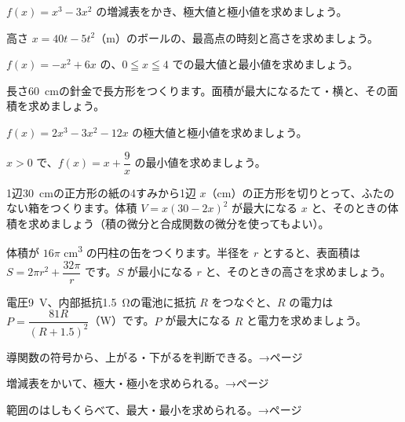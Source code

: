 \bkendproblems
{}

\bkproblem $f(x)=x^3-3x^2$ の増減表をかき、極大値と極小値を求めましょう。

\bkproblem 高さ $x=40t-5t^2$（m）のボールの、最高点の時刻と高さを求めましょう。

\bkproblem $f(x)=-x^2+6x$ の、$0\leqq x\leqq4$ での最大値と最小値を求めましょう。

\bkproblem 長さ\qty{60}{cm}の針金で長方形をつくります。面積が最大になるたて・横と、その面積を求めましょう。

\bkproblem $f(x)=2x^3-3x^2-12x$ の極大値と極小値を求めましょう。

\bkproblem $x>0$ で、$f(x)=x+\dfrac{9}{x}$ の最小値を求めましょう。


\bkproblem 1辺\qty{30}{cm}の正方形の紙の4すみから1辺 $x$（cm）の正方形を切りとって、ふたのない箱をつくります。体積 $V=x(30-2x)^2$ が最大になる $x$ と、そのときの体積を求めましょう（積の微分と合成関数の微分を使ってもよい）。

\bkproblem 体積が $16\pi$ \unit{cm^3} の円柱の缶をつくります。半径を $r$ とすると、表面積は $S=2\pi r^2+\dfrac{32\pi}{r}$ です。$S$ が最小になる $r$ と、そのときの高さを求めましょう。

\bkproblem 電圧\qty{9}{V}、内部抵抗\qty{1.5}{\ohm}の電池に抵抗 $R$ をつなぐと、$R$ の電力は $P=\dfrac{81R}{(R+1.5)^2}$（W）です。$P$ が最大になる $R$ と電力を求めましょう。

\begin{furikaeri}
\begin{checklist}
\item 導関数の符号から、上がる・下がるを判断できる。\hfill{\footnotesize\sffamily\color{bkTheme}→\pageref{bk:5-7:fugou}ページ}
\item 増減表をかいて、極大・極小を求められる。\hfill{\footnotesize\sffamily\color{bkTheme}→\pageref{bk:5-7:zougen}ページ}
\item 範囲のはしもくらべて、最大・最小を求められる。\hfill{\footnotesize\sffamily\color{bkTheme}→\pageref{bk:5-7:saidai}ページ}
\end{checklist}
\end{furikaeri}

